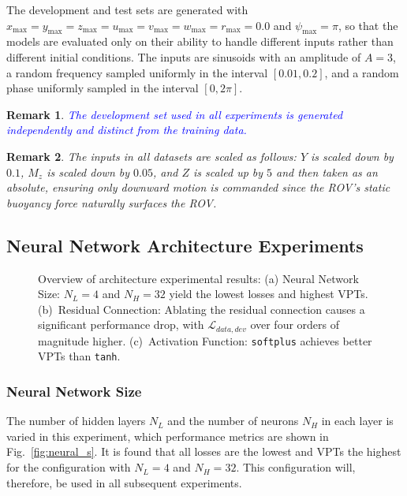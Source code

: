 \documentclass[conference]{IEEEtran}
\newtheorem{remark}{Remark}
\begin{document}
{The development and test sets are generated with $x_{\max} = y_{\max} = z_{\max} = u_{\max} = v_{\max} = w_{\max} = r_{\max} = 0.0$ and $\psi_{\max} = \pi$, so that the models are evaluated only on their ability to handle different inputs rather than different initial conditions. The inputs are sinusoids with an amplitude of $A=3$, a random frequency sampled uniformly in the interval $[0.01, 0.2]$, and a random phase uniformly sampled in the interval $[0, 2\pi]$.

\begin{remark} \textcolor{blue}{The development set used in all experiments is generated independently and distinct from the training data.} \end{remark}


\begin{remark}
    The inputs in all datasets are scaled as follows: $Y$ is scaled down by $0.1$, $M_z$ is scaled down by $0.05$, and $Z$ is scaled up by $5$ and then taken as an absolute, ensuring only downward motion is commanded since the ROV's static buoyancy force naturally surfaces the ROV.
\end{remark}



\subsection{Neural Network Architecture Experiments}
\label{subsec:nn_arch}

\newcommand{\PlotHeight}{6cm}

\begin{figure}[!t]
    \caption{Overview of architecture experimental results: (a) Neural Network Size: $N_L = 4$ and $N_H = 32$ yield the lowest losses and highest VPTs. (b)~Residual Connection: Ablating the residual connection causes a significant performance drop, with $\mathcal{L}_{data,dev}$ over four orders of magnitude higher. (c)~Activation Function: \lstinline|softplus| achieves better VPTs than \lstinline|tanh|.}
    \label{fig:architecture}
\end{figure}

\subsubsection{Neural Network Size}
The number of hidden layers $N_L$ and the number of neurons $N_H$ in each layer is varied in this experiment, which performance metrics are shown in Fig.~\ref{fig:neural_s}. It is found that all losses are the lowest and VPTs the highest for the configuration with $N_L = 4$ and $N_H = 32$. This configuration will, therefore, be used in all subsequent experiments.

}
\end{document}
